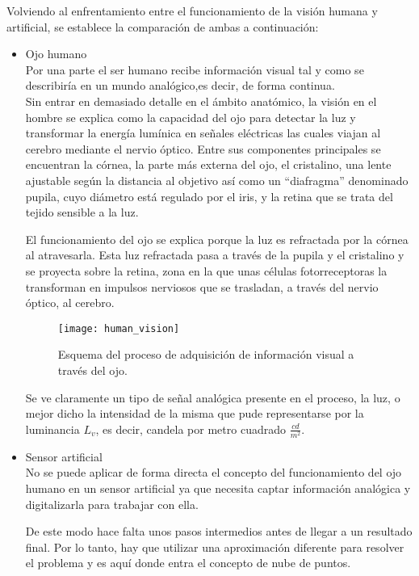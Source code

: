 Volviendo al enfrentamiento entre el funcionamiento de la visión humana y artificial, se establece la comparación de ambas a continuación:

\begin{itemize}
\item Ojo humano
\\
Por una parte el ser humano recibe información visual tal y como se describiría en un mundo analógico,es decir, de forma continua.
\\
Sin entrar en demasiado detalle en el ámbito anatómico, la visión en el hombre se explica como la capacidad del ojo para detectar la luz y transformar la energía lumínica en señales eléctricas las cuales viajan al cerebro mediante el nervio óptico. Entre sus componentes principales se encuentran la córnea, la parte más externa del ojo, el cristalino, una lente ajustable según la distancia al objetivo así como un ``diafragma'' denominado pupila, cuyo diámetro está regulado por el iris, y la retina que se trata del tejido sensible a la luz. 

El funcionamiento del ojo se explica\cite{ojo_humano} porque la luz es refractada por la córnea al atravesarla. Esta luz refractada pasa a través de la pupila y el cristalino y se proyecta sobre la retina, zona en la que unas células fotorreceptoras la transforman en impulsos nerviosos que se trasladan, a través del nervio óptico, al cerebro.


\begin{figure}[!htb]
\centering
{}
  \texttt{[image: human\_vision]}
  \caption{Esquema del proceso de adquisición de información visual a través del ojo.}\label{fig:human_vision}
\endminipage\hfill
\end{figure}

Se ve claramente un tipo de señal analógica presente en el proceso, la luz, o mejor dicho la intensidad de la misma que pude representarse por la luminancia $L_v$, es decir, candela por metro cuadrado $\frac{cd}{m^2}$.


\item Sensor artificial
\\
No se puede aplicar de forma directa el concepto del funcionamiento del ojo humano en un sensor artificial ya que necesita captar información analógica y digitalizarla para trabajar con ella.

De este modo hace falta unos pasos intermedios antes de llegar a un resultado final. Por lo tanto, hay que utilizar una aproximación diferente para resolver el problema y es aquí donde entra el concepto de nube de puntos. 
\end{itemize}

